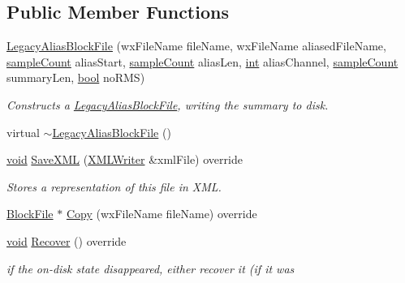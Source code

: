 \subsection*{Public Member Functions}
\begin{DoxyCompactItemize}
\item 
\hyperlink{class_legacy_alias_block_file_ada2843e677e7eb5cbe08351d6e9c2fa9}{Legacy\+Alias\+Block\+File} (wx\+File\+Name file\+Name, wx\+File\+Name aliased\+File\+Name, \hyperlink{include_2audacity_2_types_8h_afa427e1f521ea5ec12d054e8bd4d0f71}{sample\+Count} alias\+Start, \hyperlink{include_2audacity_2_types_8h_afa427e1f521ea5ec12d054e8bd4d0f71}{sample\+Count} alias\+Len, \hyperlink{xmltok_8h_a5a0d4a5641ce434f1d23533f2b2e6653}{int} alias\+Channel, \hyperlink{include_2audacity_2_types_8h_afa427e1f521ea5ec12d054e8bd4d0f71}{sample\+Count} summary\+Len, \hyperlink{mac_2config_2i386_2lib-src_2libsoxr_2soxr-config_8h_abb452686968e48b67397da5f97445f5b}{bool} no\+R\+MS)
\begin{DoxyCompactList}\small\item\em Constructs a \hyperlink{class_legacy_alias_block_file}{Legacy\+Alias\+Block\+File}, writing the summary to disk. \end{DoxyCompactList}\item 
virtual \hyperlink{class_legacy_alias_block_file_a6b526cad1e6e27f9cff5cf59e5adf9d3}{$\sim$\+Legacy\+Alias\+Block\+File} ()
\item 
\hyperlink{sound_8c_ae35f5844602719cf66324f4de2a658b3}{void} \hyperlink{class_legacy_alias_block_file_a7563524d8ba1b8cb881d702c92d76b35}{Save\+X\+ML} (\hyperlink{class_x_m_l_writer}{X\+M\+L\+Writer} \&xml\+File) override
\begin{DoxyCompactList}\small\item\em Stores a representation of this file in X\+ML. \end{DoxyCompactList}\item 
\hyperlink{class_block_file}{Block\+File} $\ast$ \hyperlink{class_legacy_alias_block_file_a9d9a2503627bae02ae06e890ae2c7546}{Copy} (wx\+File\+Name file\+Name) override
\item 
\hyperlink{sound_8c_ae35f5844602719cf66324f4de2a658b3}{void} \hyperlink{class_legacy_alias_block_file_abc85349ae38891ddebb0db926df9f97f}{Recover} () override
\begin{DoxyCompactList}\small\item\em if the on-\/disk state disappeared, either recover it (if it was \end{DoxyCompactList}\end{DoxyCompactItemize}
